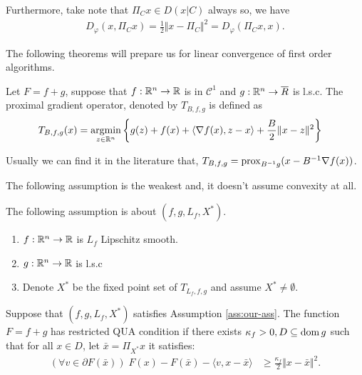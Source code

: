 \documentclass[12pt]{article}
\begin{document}
    Furthermore, take note that $\Pi_C x \in D(x | C)$ always so, we have
    \begin{align}
        D_\varphi(x, \Pi_C x) = \frac{1}{2}\Vert x - \Pi_C \Vert^2 = D_\varphi(\Pi_C x, x). 
    \end{align}
    \par
    The following theorems will prepare us for linear convergence of first order algorithms. 
    \begin{definition}\label{def:pg}
        Let $F = f + g$, suppose that $f : \mathbb R^n \rightarrow \mathbb R$ is in $\mathcal C^1$ and $g: \mathbb R^n \rightarrow \overline R$ is l.s.c. 
        The proximal gradient operator, denoted by $T_{B, f, g}$ is defined as
        \begin{align*}
            T_{B, f, g}(x) &= \mathop{\rm argmin}\limits_{z\in \mathbb R^n} \left\lbrace
                g(z) + f(x) + \langle \nabla f(x), z - x\rangle + \frac{B}{2}\Vert x - z\Vert^2
            \right\rbrace
        \end{align*}
    \end{definition}
    \begin{remark}
        Usually we can find it in the literature that, $T_{B, f, g} = \operatorname{prox}_{B^{-1}g}(x - B^{-1}\nabla f(x))$. 
    \end{remark}
    The following assumption is the weakest and, it doesn't assume convexity at all. 
    \begin{assumption}\label{ass:our-ass}
        The following assumption is about $(f, g, L_f, X^*)$. 
        \begin{enumerate}
            \item $f: \mathbb R^n \rightarrow \mathbb R$ is $L_f$ Lipschitz smooth. 
            \item $g: \mathbb R^n \rightarrow \mathbb R$ is l.s.c
            \item Denote $X^*$ be the fixed point set of $T_{L_f, f, g}$ and assume $X^* \neq \emptyset$. 
        \end{enumerate}
    \end{assumption}
    \begin{definition}
        Suppose that $(f, g, L_f, X^*)$ satisfies Assumption \ref{ass:our-ass}. 
        The function $F = f + g$ has restricted QUA condition if there exists $\kappa_f > 0, D \subseteq \operatorname{dom} g$ such that for all $x \in D$, let $\bar x = \Pi_{X^*}x$ it satisfies: 
        \begin{align*}
            \left(\forall v \in \partial F(\bar x)\right)\;
            F(x) - F(\bar x) - \langle v, x - \bar x\rangle 
            &\ge \frac{\kappa_f}{2}\Vert x - \bar x\Vert^2. 
        \end{align*}
    \end{definition}
\end{document}
